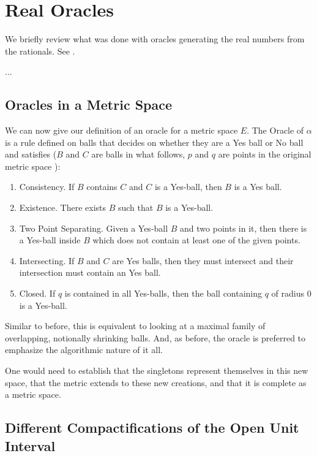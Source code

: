 \documentclass[12pt]{article}
\begin{document}
\section{Real Oracles}

We briefly review what was done with oracles generating the real numbers from the rationals. See \cite{taylor23main}.

...



\subsection{Oracles in a Metric Space}

We can now give our definition of an oracle for a metric space $E$. The Oracle of $\alpha$ is a rule defined on balls that decides on whether they are a Yes ball or No ball and satisfies ($B$ and $C$ are balls in what follows, $p$ and $q$ are points in the original metric space ): 
\begin{enumerate}
    \item Consistency. If $B$ contains $C$ and $C$ is a Yes-ball, then $B$ is a Yes ball.
    \item Existence. There exists $B$ such that $B$ is a Yes-ball.
    \item Two Point Separating. Given a Yes-ball $B$ and two points in it, then there is a Yes-ball inside $B$ which does not contain at least one of the given points. 
    \item Intersecting. If $B$ and $C$ are Yes balls, then they must intersect and their intersection must contain an Yes ball.
    \item Closed. If $q$ is contained in all Yes-balls, then the ball containing $q$ of radius 0 is a Yes-ball. 
\end{enumerate}

Similar to before, this is equivalent to looking at a maximal family of overlapping, notionally shrinking balls. And, as before, the oracle is preferred to emphasize the algorithmic nature of it all. 

One would need to establish that the singletons represent themselves in this new space, that the metric extends to these new creations, and that it is complete as a metric space.




\subsection{Different Compactifications of the Open Unit Interval}
\end{document}
